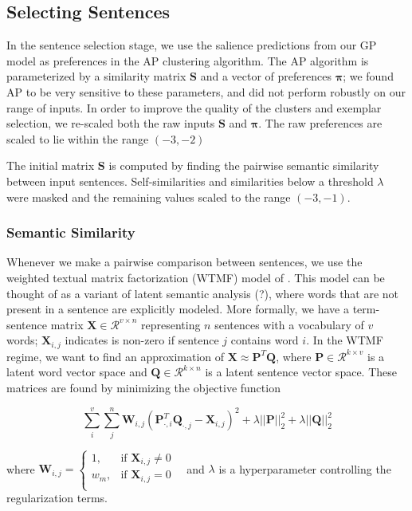\subsection{Selecting Sentences}
\label{sec:ap}
In the sentence selection stage, we use the salience predictions from our GP
model as preferences in the AP clustering algorithm. The AP algorithm is 
parameterized by a similarity matrix $\mathbf{S}$ and a vector of 
preferences $\boldsymbol{\pi}$; we found AP to be very sensitive to these
parameters, and did not perform robustly on our range of inputs.
In order to improve the quality of the clusters and exemplar selection,
we re-scaled both the raw inputs $\mathbf{S}$ and $\boldsymbol{\pi}$. 
The raw preferences are scaled to lie within the  range $(-3, -2)$

The initial matrix $\mathbf{S}$ is computed by finding the pairwise semantic
similarity between input sentences. Self-similarities and similarities below 
a threshold $\lambda$ were masked and the remaining values scaled to the range
$(-3, -1)$.

\subsubsection{Semantic Similarity}\label{subsec:semsim}

Whenever we make a pairwise comparison between sentences, we use the weighted
textual matrix factorization (WTMF) model of \cite{guo2012simple}. This 
model can be thought of as a variant of latent semantic analysis (?), 
where words that are not present in a sentence are explicitly modeled.
More formally, we have a term-sentence matrix 
$\mathbf{X}\in\mathcal{R}^{v \times n}$ representing $n$ sentences with a 
vocabulary of $v$ words; $\mathbf{X}_{i,j}$ indicates is non-zero if sentence
$j$ contains word $i$. In the WTMF regime, we want to find an approximation
of $\mathbf{X} \approx \mathbf{P}^T\mathbf{Q}$, where 
$\mathbf{P} \in \mathcal{R}^{k \times v}$ is a latent word vector space and
$\mathbf{Q} \in \mathcal{R}^{k \times n}$ is a latent sentence vector
space. These matrices are found by minimizing the objective function

$$\sum_i^v \sum_j^n \mathbf{W}_{i,j}(\mathbf{P}_{\cdot,i}^T
\mathbf{Q}_{\cdot,j} 
- \mathbf{X}_{i,j})^2 
 + \lambda ||\mathbf{P}||_2^2 + \lambda ||\mathbf{Q}||_2^2$$

where $\mathbf{W}_{i,j} = 
\begin{cases} 1, & \textrm{if $\mathbf{X}_{i,j} \ne 0$ } \\
w_m, & \textrm{if $\mathbf{X}_{i,j} = 0$ }\\
\end{cases}$
and $\lambda$ is a hyperparameter controlling the regularization terms.

